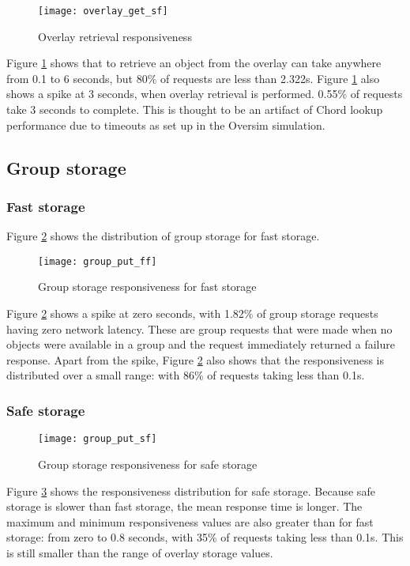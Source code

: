 \begin{figure}[htbp]
 \centering
 \texttt{[image: overlay\_get\_sf]}
 \caption{Overlay retrieval responsiveness}
 \label{fig_overlay_get_sf}
\end{figure}
%
Figure \ref{fig_overlay_get_sf} shows that to retrieve an object from the overlay can take anywhere from 0.1 to 6 seconds, but 80\% of requests are less than 2.322s. Figure \ref{fig_overlay_get_sf} also shows a spike at 3 seconds, when overlay retrieval is performed. 0.55\% of requests take 3 seconds to complete. This is thought to be an artifact of Chord lookup performance due to timeouts as set up in the Oversim simulation.

\subsection{Group storage}
\label{group_storage_eval}

\subsubsection{Fast storage}
\label{group_put_f_fp}

Figure \ref{fig_group_put_ff} shows the distribution of group storage for fast storage.

\begin{figure}[htbp]
 \centering
 \texttt{[image: group\_put\_ff]}
 \caption{Group storage responsiveness for fast storage}
 \label{fig_group_put_ff}
\end{figure}
%
Figure \ref{fig_group_put_ff} shows a spike at zero seconds, with 1.82\% of group storage requests having zero network latency. These are group requests that were made when no objects were available in a group and the request immediately returned a failure response. Apart from the spike, Figure \ref{fig_group_put_ff} also shows that the responsiveness is distributed over a small range: with 86\% of requests taking less than 0.1s.

\subsubsection{Safe storage}
\begin{figure}[htbp]
 \centering
 \texttt{[image: group\_put\_sf]}
 \caption{Group storage responsiveness for safe storage}
 \label{fig_group_put_sf}
\end{figure}
%
Figure \ref{fig_group_put_sf} shows the responsiveness distribution for safe storage. Because safe storage is slower than fast storage, the mean response time is longer. The maximum and minimum responsiveness values are also greater than for fast storage: from zero to 0.8 seconds, with 35\% of requests taking less than 0.1s. This is still smaller than the range of overlay storage values.

